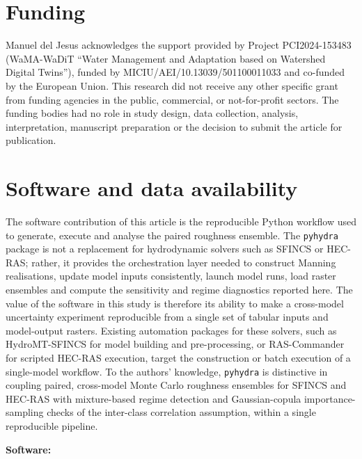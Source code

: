 \documentclass[a4paper,fleqn]{cas-sc}
\newcommand{\sfincs}{\textsc{SFINCS}}
\newcommand{\hecras}{\textsc{HEC-RAS}}
\begin{document}
\section*{Funding}
Manuel del Jesus acknowledges the support provided by Project PCI2024-153483
(WaMA-WaDiT ``Water Management and Adaptation based on Watershed Digital
Twins''), funded by MICIU/AEI/10.13039/501100011033 and co-funded by the
European Union. This research did not receive any other specific grant from
funding agencies in the public, commercial, or not-for-profit sectors. The
funding bodies had no role in study design, data collection, analysis,
interpretation, manuscript preparation or the decision to submit the article
for publication.

\section*{Software and data availability}

\begin{sloppypar}
The software contribution of this article is the reproducible Python workflow
used to generate, execute and analyse the paired roughness ensemble. The
\texttt{pyhydra} package is not a replacement for hydrodynamic solvers such as
\sfincs{} or \hecras{}; rather, it provides the orchestration layer needed to
construct Manning realisations, update model inputs consistently, launch model
runs, load raster ensembles and compute the sensitivity and regime diagnostics
reported here. The value of the software in this study is therefore its
ability to make a cross-model uncertainty experiment reproducible from a single
set of tabular inputs and model-output rasters. Existing automation packages
for these solvers, such as HydroMT-SFINCS \citep{eilander2023hydromt} for model
building and pre-processing, or RAS-Commander for scripted \hecras{} execution,
target the construction or batch execution of a single-model workflow. To the
authors' knowledge, \texttt{pyhydra} is distinctive in coupling paired,
cross-model Monte Carlo roughness ensembles for \sfincs{} and \hecras{} with
mixture-based regime detection and Gaussian-copula importance-sampling checks
of the inter-class correlation assumption, within a single reproducible
pipeline.
\end{sloppypar}

\noindent\textbf{Software:}
\end{document}
